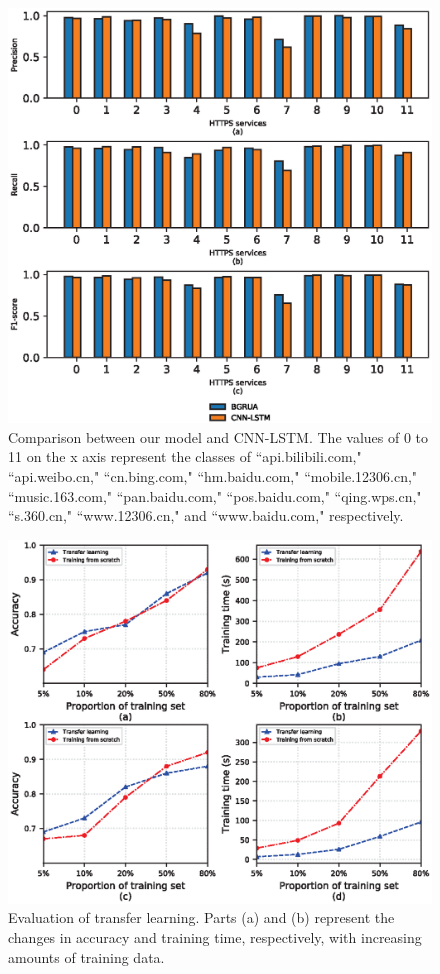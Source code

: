 \documentclass[preprint,12pt]{elsarticle}
\begin{document}
\begin{figure}[]
\centering
\includegraphics[width=\textwidth]{histogram.eps}
\caption{Comparison between our model and CNN-LSTM. The values of 0 to 11 on the x axis represent the classes of ``api.bilibili.com," ``api.weibo.cn," ``cn.bing.com," ``hm.baidu.com," ``mobile.12306.cn," ``music.163.com," ``pan.baidu.com," ``pos.baidu.com," ``qing.wps.cn," ``s.360.cn," ``www.12306.cn," and ``www.baidu.com," respectively.}\label{fig10}
\end{figure}

\begin{figure}[t]
\centering
\includegraphics[width=\textwidth]{transfer.eps}
\caption{Evaluation of transfer learning. Parts (a) and (b) represent the changes in accuracy and training time, respectively, with increasing amounts of training data.}\label{fig11}
\end{figure}
\end{document}
